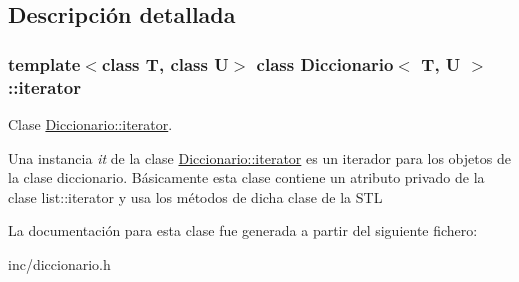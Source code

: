 \subsection{Descripción detallada}
\subsubsection*{template$<$class T, class U$>$\newline
class Diccionario$<$ T, U $>$\+::iterator}

Clase \hyperlink{classDiccionario_1_1iterator}{Diccionario\+::iterator}. 

Una instancia {\itshape it} de la clase \hyperlink{classDiccionario_1_1iterator}{Diccionario\+::iterator} es un iterador para los objetos de la clase diccionario. Básicamente esta clase contiene un atributo privado de la clase list\+::iterator y usa los métodos de dicha clase de la S\+TL 

La documentación para esta clase fue generada a partir del siguiente fichero\+:\begin{DoxyCompactItemize}
\item 
inc/diccionario.\+h\end{DoxyCompactItemize}
